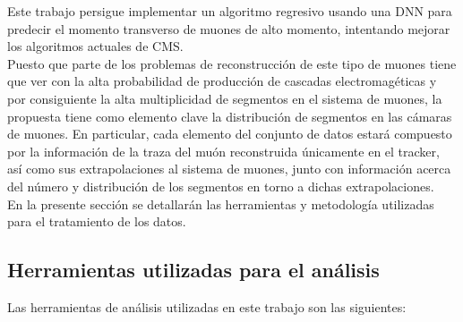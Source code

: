 Este trabajo persigue implementar un algoritmo regresivo usando una DNN para predecir el momento transverso de muones de alto momento, intentando mejorar los algoritmos actuales de CMS. \\

Puesto que parte de los problemas de reconstrucci\'on de este tipo de muones tiene que ver con la alta probabilidad de producci\'on de cascadas electromag\'eticas y por consiguiente la alta multiplicidad de segmentos en el sistema de muones, la propuesta tiene como elemento clave la distribuci\'on de segmentos en las c\'amaras de muones. En particular, cada elemento del conjunto de datos estar\'a compuesto por la informaci\'on de la traza del mu\'on reconstruida \'unicamente en el tracker, as\'i como sus extrapolaciones al sistema de muones, junto con informaci\'on acerca del n\'umero y distribuci\'on de los segmentos en torno a dichas extrapolaciones. \\

En la presente secci\'on se detallar\'an las herramientas y metodolog\'ia utilizadas para el tratamiento de los datos.


\subsection{Herramientas utilizadas para el an\'alisis}\label{sec:tools}

Las herramientas de an\'alisis utilizadas en este trabajo son las siguientes:

